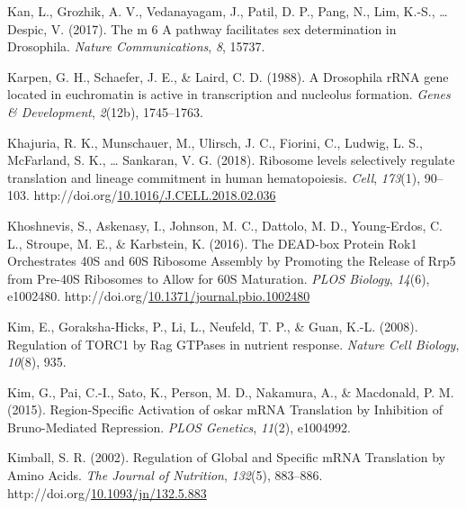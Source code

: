 \documentclass[12pt,oneside]{reedthesis}
\newlength{\cslhangindent}
\newenvironment{CSLReferences}[2] %
 {%
  \setlength{\parindent}{0pt}
  \ifodd #1 \everypar{\setlength{\hangindent}{\cslhangindent}}\ignorespaces\fi
  \ifnum #2 > 0
  \setlength{\parskip}{#2\baselineskip}
  \fi
 }%
 {}
\begin{document}
\begin{CSLReferences}{1}{0}
\leavevmode{}%
Kan, L., Grozhik, A. V., Vedanayagam, J., Patil, D. P., Pang, N., Lim, K.-S., \ldots{} Despic, V. (2017). The m 6 {A} pathway facilitates sex determination in {Drosophila}. \emph{Nature Communications}, \emph{8}, 15737.

\leavevmode{}%
Karpen, G. H., Schaefer, J. E., \& Laird, C. D. (1988). A {Drosophila rRNA} gene located in euchromatin is active in transcription and nucleolus formation. \emph{Genes \& Development}, \emph{2}(12b), 1745--1763.

\leavevmode{}%
Khajuria, R. K., Munschauer, M., Ulirsch, J. C., Fiorini, C., Ludwig, L. S., McFarland, S. K., \ldots{} Sankaran, V. G. (2018). Ribosome levels selectively regulate translation and lineage commitment in human hematopoiesis. \emph{Cell}, \emph{173}(1), 90--103. http://doi.org/\href{https://doi.org/10.1016/J.CELL.2018.02.036}{10.1016/J.CELL.2018.02.036}

\leavevmode{}%
Khoshnevis, S., Askenasy, I., Johnson, M. C., Dattolo, M. D., Young-Erdos, C. L., Stroupe, M. E., \& Karbstein, K. (2016). The {DEAD}-box {Protein Rok1 Orchestrates 40S} and {60S Ribosome Assembly} by {Promoting} the {Release} of {Rrp5} from {Pre}-{40S Ribosomes} to {Allow} for {60S Maturation}. \emph{PLOS Biology}, \emph{14}(6), e1002480. http://doi.org/\href{https://doi.org/10.1371/journal.pbio.1002480}{10.1371/journal.pbio.1002480}

\leavevmode{}%
Kim, E., Goraksha-Hicks, P., Li, L., Neufeld, T. P., \& Guan, K.-L. (2008). Regulation of {TORC1} by {Rag GTPases} in nutrient response. \emph{Nature Cell Biology}, \emph{10}(8), 935.

\leavevmode{}%
Kim, G., Pai, C.-I., Sato, K., Person, M. D., Nakamura, A., \& Macdonald, P. M. (2015). Region-{Specific Activation} of oskar {mRNA Translation} by {Inhibition} of {Bruno}-{Mediated Repression}. \emph{PLOS Genetics}, \emph{11}(2), e1004992.

\leavevmode{}%
Kimball, S. R. (2002). Regulation of {Global} and {Specific mRNA Translation} by {Amino Acids}. \emph{The Journal of Nutrition}, \emph{132}(5), 883--886. http://doi.org/\href{https://doi.org/10.1093/jn/132.5.883}{10.1093/jn/132.5.883}


\end{CSLReferences}
\end{document}
